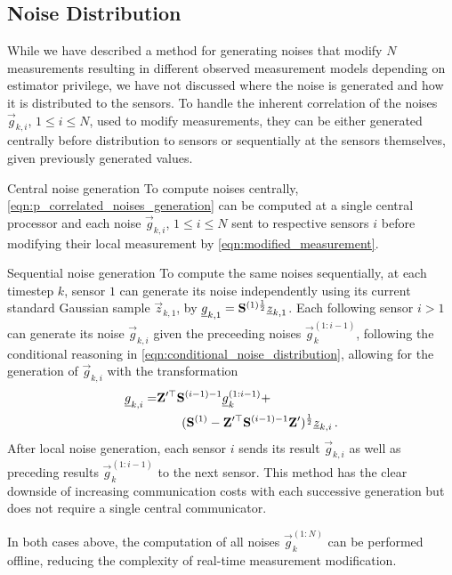 \documentclass[conference]{IEEEtran}
\theoremstyle{definition}
\theoremstyle{remark}
\begin{document}
% 
% 

\subsection{Noise Distribution}\label{subsec:noise_dist}
While we have described a method for generating noises that modify $N$ measurements resulting in different observed measurement models depending on estimator privilege, we have not discussed where the noise is generated and how it is distributed to the sensors. To handle the inherent correlation of the noises $\vec{g}_{k,i}$, $1\leq i \leq N$, used to modify measurements, they can be either generated centrally before distribution to sensors or sequentially at the sensors themselves, given previously generated values.
\begin{LaTeXdescription}
  \item[Central noise generation] To compute noises centrally, \eqref{eqn:p_correlated_noises_generation} can be computed at a single central processor and each noise $\vec{g}_{k,i}$, $1\leq i \leq N$ sent to respective sensors $i$ before modifying their local measurement by \eqref{eqn:modified_measurement}.
  \item[Sequential noise generation] To compute the same noises sequentially, at each timestep $k$, sensor $1$ can generate its noise independently using its current standard Gaussian sample $\vec{z}_{k,1}$, by ${\underline{g}}_{k,1} = {{\mathbf{S}}}^{(1)\frac{1}{2}}{\underline{z}}_{k,1}$. Each following sensor $i>1$ can generate its noise $\vec{g}_{k,i}$ given the preceeding noises $\vec{g}_k^{(1:i-1)}$, following the conditional reasoning in \eqref{eqn:conditional_noise_distribution}, allowing for the generation of $\vec{g}_{k,i}$ with the transformation
  \begin{equation}
    \begin{split}
      {\underline{g}}_{k,i} = &{{\mathbf{Z}}}^{\prime\top}{{\mathbf{S}}}^{(i-1)-1}{\underline{g}}_k^{(1:i-1)} +\\
      &\qquad ({{\mathbf{S}}}^{(1)}-{{\mathbf{Z}}}^{\prime\top}{{\mathbf{S}}}^{(i-1)-1}{{\mathbf{Z}}}^\prime)^\frac{1}{2}{\underline{z}}_{k,i}\,.
    \end{split}
  \end{equation}
  After local noise generation, each sensor $i$ sends its result $\vec{g}_{k,i}$ as well as preceding results $\vec{g}_k^{(1:i-1)}$ to the next sensor. This method has the clear downside of increasing communication costs with each successive generation but does not require a single central communicator.
\end{LaTeXdescription}
In both cases above, the computation of all noises $\vec{g}_k^{(1:N)}$ can be performed offline, reducing the complexity of real-time measurement modification.
\end{document}
